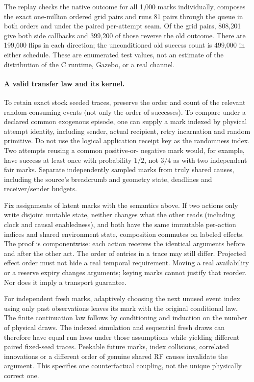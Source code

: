 \documentclass[11pt]{article}
\begin{document}
The replay checks the native outcome for all 1,000 marks
individually, composes the exact one-million ordered grid pairs
and runs 81 pairs through the queue in both orders and under the
paired per-attempt seam. Of the grid pairs, 808,201 give both side
callbacks and 399,200 of those reverse the old outcome. There
are 199,600 flips in each direction; the unconditioned old
success count is 499,000 in either schedule. These are enumerated
test values, not an estimate of the distribution of the C runtime,
Gazebo, or a real channel.

\paragraph{A valid transfer law and its kernel.}
To retain exact stock seeded traces, preserve the order and count
of the relevant random-consuming events (not only the order of
successes). To compare under a declared common exogenous episode,
one can supply a mark indexed by physical attempt identity,
including sender, actual recipient, retry incarnation and random
primitive. Do not use the logical application receipt key as
the randomness index. Two attempts reusing a common positive-or-
negative mark would, for example, have success at least once
with probability \(1/2\), not \(3/4\) as with two independent
fair marks. Separate independently sampled marks from truly
shared causes, including the source's breadcrumb and geometry
state, deadlines and receiver/sender budgets.

Fix assignments of latent marks with the semantics above. If two
actions only write disjoint mutable state, neither changes what
the other reads (including clock and causal enabledness), and
both have the same immutable per-action indices and shared
environment state, composition commutes on labeled effects.
The proof is componentwise: each action receives the identical
arguments before and after the other act. The order of entries
in a trace may still differ. Projected effect order must not
hide a real temporal requirement. Moving a real availability
or a reserve expiry changes arguments; keying marks cannot
justify that reorder. Nor does it imply a transport guarantee.

For independent fresh marks, adaptively choosing the next unused
event index using only past observations leaves its mark with the
original conditional law. The finite continuation law follows
by conditioning and induction on the number of physical draws.
The indexed simulation and sequential fresh draws can therefore
have equal run laws under those assumptions while yielding different
paired fixed-seed traces. Peekable future marks, index collisions,
correlated innovations or a different order of genuine shared RF
causes invalidate the argument. This specifies one counterfactual
coupling, not the unique physically correct one.
\end{document}

